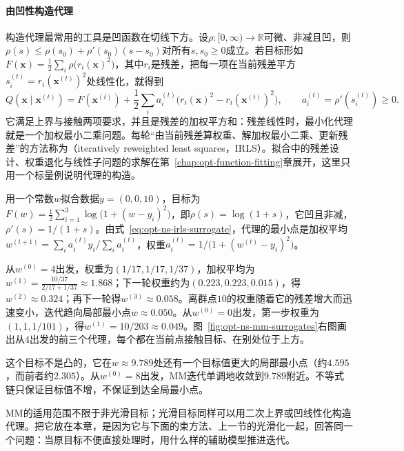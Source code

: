 \paragraph{由凹性构造代理}
构造代理最常用的工具是凹函数在切线下方。设$\rho:[0,\infty)\to\mathbb R$可微、非减且凹，则$\rho(s)\leq\rho(s_0)+\rho'(s_0)(s-s_0)$对所有$s,s_0\geq0$成立。若目标形如$F(\bm x)=\frac12\sum_i\rho\bigl(r_i(\bm x)^2\bigr)$，其中$r_i$是残差，把每一项在当前残差平方$s_i^{(t)}=r_i(\bm x^{(t)})^2$处线性化，就得到
\begin{equation}
 Q(\bm x\mid\bm x^{(t)})=F(\bm x^{(t)})+\frac12\sum_ia_i^{(t)}\bigl(r_i(\bm x)^2-r_i(\bm x^{(t)})^2\bigr),\qquad a_i^{(t)}=\rho'(s_i^{(t)})\geq0 .
 \label{eq:opt-ns-irls-surrogate}
\end{equation}
它满足上界与接触两项要求，并且是残差的加权平方和：残差线性时，最小化代理就是一个加权最小二乘问题。每轮“由当前残差算权重、解加权最小二乘、更新残差”的方法称为（iteratively reweighted least squares，IRLS）。拟合中的残差设计、权重退化与线性子问题的求解在第~\ref{chap:opt-function-fitting}章展开，这里只用一个标量例说明代理的构造。

\begin{example}[Cauchy损失的MM迭代]
\label{ex:opt-ns-cauchy-mm}
用一个常数$w$拟合数据$y=(0,0,10)$，目标为$F(w)=\frac12\sum_{i=1}^3\log\bigl(1+(w-y_i)^2\bigr)$，即$\rho(s)=\log(1+s)$，它凹且非减，$\rho'(s)=1/(1+s)$。由式~\eqref{eq:opt-ns-irls-surrogate}，代理的最小点是加权平均$w^{(t+1)}=\sum_ia_i^{(t)}y_i/\sum_ia_i^{(t)}$，权重$a_i^{(t)}=1/\bigl(1+(w^{(t)}-y_i)^2\bigr)$。

从$w^{(0)}=4$出发，权重为$(1/17,1/17,1/37)$，加权平均为$w^{(1)}=\frac{10/37}{2/17+1/37}\approx1.868$；下一轮权重约为$(0.223,0.223,0.015)$，得$w^{(2)}\approx0.324$；再下一轮得$w^{(3)}\approx0.058$。离群点$10$的权重随着它的残差增大而迅速变小，迭代趋向局部最小点$w\approx0.050$。从$w^{(0)}=0$出发，第一步权重为$(1,1,1/101)$，得$w^{(1)}=10/203\approx0.049$。图~\ref{fig:opt-ns-mm-surrogates}右图画出从$4$出发的前三个代理，每个都在当前点接触目标、在别处位于上方。

这个目标不是凸的，它在$w\approx9.789$处还有一个目标值更大的局部最小点（约$4.595$，而前者约$2.305$）。从$w^{(0)}=8$出发，MM迭代单调地收敛到$9.789$附近。不等式链只保证目标值不增，不保证到达全局最小点。
\end{example}

MM的适用范围不限于非光滑目标；光滑目标同样可以用二次上界或凹线性化构造代理。把它放在本章，是因为它与下面的束方法、上一节的光滑化一起，回答同一个问题：当原目标不便直接处理时，用什么样的辅助模型推进迭代。

